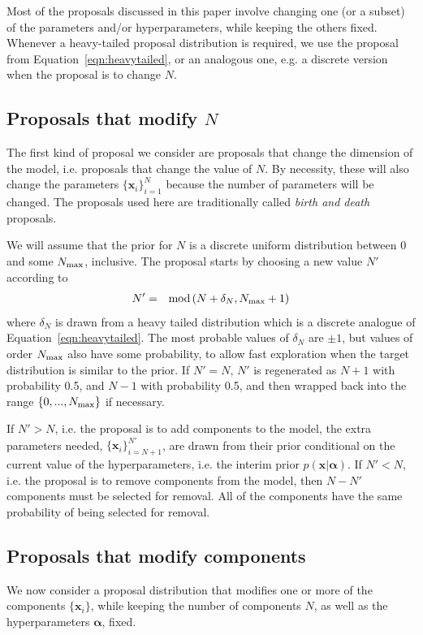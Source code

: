 \documentclass[letterpaper, 11pt]{article}
\newcommand{\hyperparams}{\boldsymbol{\alpha}}
\newcommand{\xx}{\mathbf{x}}
\begin{document}
Most of the proposals discussed in this paper involve changing one
(or a subset) of the parameters and/or hyperparameters, while keeping the
others fixed. Whenever a heavy-tailed proposal distribution
is required, we use the proposal from Equation~\ref{eqn:heavytailed},
or an analogous one, e.g. a discrete version when the proposal is to change $N$.


\subsection{Proposals that modify $N$}\label{sec:proposal1}
The first kind of proposal we consider are proposals that change the
dimension of the model, i.e. proposals that change the value of $N$. By
necessity, these will also change the parameters $\{\xx_i\}_{i=1}^N$ because
the number of parameters will be changed. The proposals used here are
traditionally called {\it birth and death} proposals.

We will assume that the prior for $N$ is a discrete uniform distribution
between 0 and some $N_{\rm max}$, inclusive. The proposal starts by choosing
a new value $N'$ according to
\begin{eqnarray}
N' &=& \textnormal{mod}\left(N + \delta_N, N_{\rm max} + 1\right)
\end{eqnarray}
where $\delta_N$ is drawn from a heavy tailed
distribution which is a discrete analogue of Equation~\ref{eqn:heavytailed}.
The most probable values of $\delta_N$ are $\pm 1$, but values
of order $N_{\rm max}$ also have some probability, to allow fast exploration
when the target distribution is similar to the prior. If $N' = N$, $N'$ is
regenerated as $N+1$ with probability 0.5, and $N-1$ with probability 0.5,
and then wrapped back into the range $\{0,...,N_{\rm max}\}$ if necessary.

If $N' > N$, i.e. the proposal is to add components to the model,
the extra parameters needed, $\{\xx_i\}_{i=N+1}^{N'}$,
are drawn from their prior conditional on the current value of the
hyperparameters, i.e. the interim prior $p(\xx | \hyperparams)$.
If $N' < N$, i.e. the proposal is to remove components from the model,
then $N - N'$ components must be selected for removal. All
of the components have the same probability of being selected for removal.

\subsection{Proposals that modify components}\label{sec:proposal2}
We now consider a proposal distribution that modifies one or more of the
components $\{\xx_i\}$, while keeping the number of components $N$, as well as the
hyperparameters $\hyperparams$, fixed.
\end{document}
